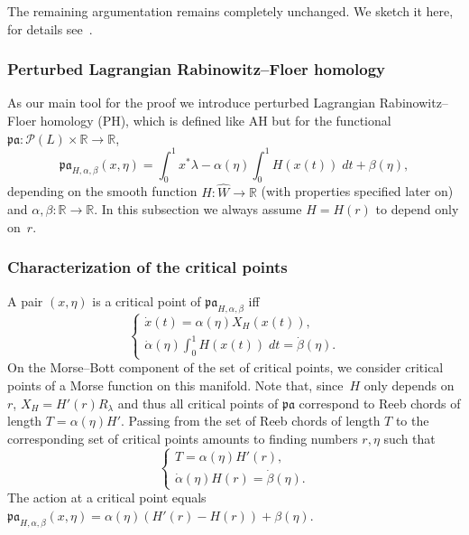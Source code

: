\documentclass{amsart}
\newcommand{\Pcal}{{\mathcal{P}}}
\newcommand{\pacal}{\mathfrak{pa}}
\newcommand{\RR}{\mathbb{R}}
\newcommand{\haat}{\widehat}
\theoremstyle{definition}
\theoremstyle{remark}
\numberwithin{equation}{section}
\begin{document}
The remaining argumentation remains completely unchanged. We sketch it here, for details see~\cite{CFO10}. 

\subsubsection*{Perturbed Lagrangian Rabinowitz--Floer homology}
As our main tool for the proof we introduce perturbed Lagrangian Rabinowitz--Floer homology (PH), which is defined like AH but for the functional $\pacal:\Pcal(L)\times\RR\to\RR$,
\begin{equation*}
\pacal_{H,\alpha,\beta}(x,\eta)=\int_0^1 x^*\lambda - \alpha(\eta)\int_0^1H(x(t))\;dt+\beta(\eta),
\label{PA}
\end{equation*}
depending on the smooth function $H:\haat W\to\RR$ (with properties specified later on) and $\alpha,\beta:\RR\to\RR$. In this subsection we always assume $H=H(r)$ to depend only on~$r$. 

\subsubsection*{Characterization of the critical points}
A pair $(x,\eta)$ is a critical point of $\pacal_{H,\alpha,\beta}$ iff
\begin{equation}
\label{Pcrit}
	\begin{cases}
		\dot x(t)=\alpha(\eta)X_H(x(t)),\\
		\dot\alpha(\eta)\int_0^1 H(x(t))\;dt=\dot\beta(\eta).
	\end{cases}
\end{equation}
On the Morse--Bott component of the set of critical points, we consider critical points of a Morse function on this manifold. Note that, since~$H$ only depends on~$r$, $X_H=H'(r)R_\lambda$ and thus all critical points of $\pacal$ correspond to Reeb chords of length $T=\alpha(\eta)H'$. Passing from the set of Reeb chords of length $T$ to the corresponding set of critical points amounts to finding numbers $r,\eta$ such that 
\begin{equation}
\label{Pcrit'}
	\begin{cases}
		T=\alpha(\eta)H'(r),\\
		\dot\alpha(\eta)H(r)=\dot\beta(\eta).
	\end{cases}
\end{equation}
The action at a critical point equals $\pacal_{H,\alpha,\beta}(x,\eta)=\alpha(\eta)(H'(r) - H(r))+\beta(\eta)$.
\end{document}
